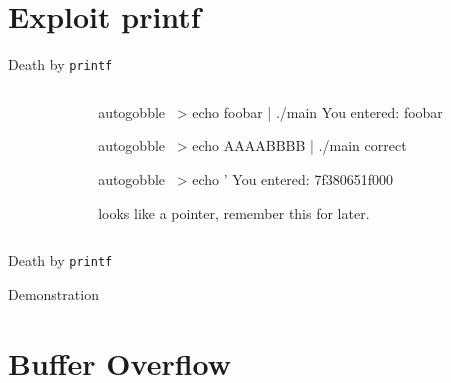 \documentclass[beamer]{uibk}
\begin{document}
\section{Exploit printf}

\begin{frame}[fragile]{Death by \texttt{printf}}
    \begin{columns}
        \begin{column}{0.5\textwidth}
        \end{column}
        \begin{column}{0.5\textwidth}
            \pause
            \begin{pre*}{autogobble}
                ~> echo foobar | ./main
                You entered:
                foobar
            \end{pre*}
            \bigskip\pause
            \begin{pre*}{autogobble}
                ~> echo AAAABBBB | ./main
                correct
            \end{pre*}
            \bigskip\pause
            \begin{pre*} {autogobble}
                ~> echo '%
                You entered:
                7f380651f000
            \end{pre*}
            \medskip
            looks like a pointer, remember this for later.
        \end{column}
    \end{columns}
\end{frame}

\begin{frame}{Death by \texttt{printf}}
    \begin{center}
        \huge Demonstration
    \end{center}
\end{frame}

\section{Buffer Overflow}
\end{document}
